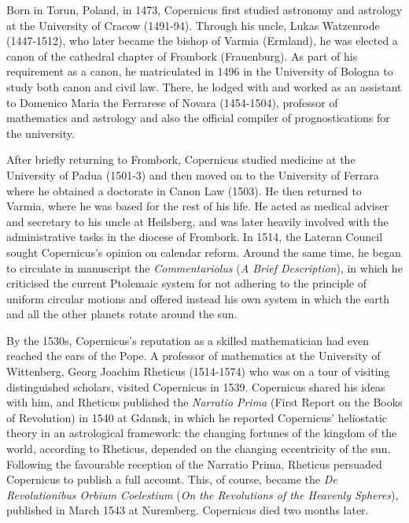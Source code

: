 Born in Torun, Poland, in 1473, Copernicus first studied astronomy and astrology at the University of Cracow (1491-94). Through his uncle, Lukas Watzenrode (1447-1512), who later became the bishop of Varmia (Ermland), he was elected a canon of the cathedral chapter of Frombork (Frauenburg). As part of his requirement as a canon, he matriculated in 1496 in the University of Bologna to study both canon and civil law. There, he lodged with and worked as an assistant to Domenico Maria the Ferrarese of Novara (1454-1504), professor of mathematics and astrology and also the official compiler of prognostications for the university.

After briefly returning to Frombork, Copernicus studied medicine at the University of Padua (1501-3) and then moved on to the University of Ferrara where he obtained a doctorate in Canon Law (1503). He then returned to Varmia, where he was based for the rest of his life. He acted as medical adviser and secretary to his uncle at Heilsberg, and was later heavily involved with the administrative tasks in the diocese of Frombork. In 1514, the Lateran Council sought Copernicus's opinion on calendar reform. Around the same time, he began to circulate in manuscript the \textit{Commentariolus} (\textit{A Brief Description}), in which he criticised the current Ptolemaic system for not adhering to the principle of uniform circular motions and offered instead his own system in which the earth and all the other planets rotate around the sun.

By the 1530s, Copernicus's reputation as a skilled mathematician had even reached the ears of the Pope. A professor of mathematics at the University of Wittenberg, Georg Joachim Rheticus (1514-1574) who was on a tour of visiting distinguished scholars, visited Copernicus in 1539. Copernicus shared his ideas with him, and Rheticus published the \textit{Narratio Prima} (First Report on the Books of Revolution) in 1540 at Gdansk, in which he reported Copernicus' heliostatic theory in an astrological framework: the changing fortunes of the kingdom of the world, according to Rheticus, depended on the changing eccentricity of the sun. Following the favourable reception of the Narratio Prima, Rheticus persuaded Copernicus to publish a full account. This, of course, became the \textit{De Revolutionibus Orbium Coelestium} (\textit{On the Revolutions of the Heavenly Spheres}), published in March 1543 at Nuremberg. Copernicus died two months later.

